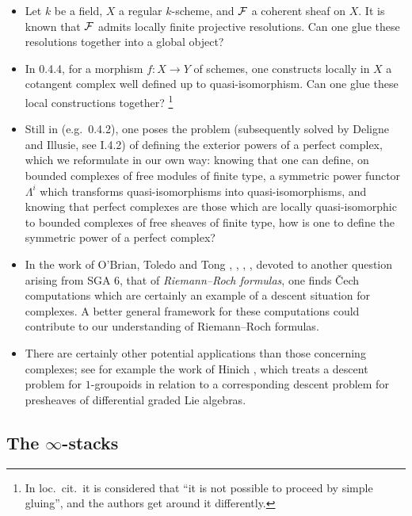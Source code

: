 \begin{itemize}
\item
Let $k$ be a field, $X$ a regular $k$-scheme, and ${\cal F}$ a coherent sheaf on
$X$. It is known that ${\cal F}$ admits locally finite projective resolutions.
Can one glue these resolutions together into a global object?
\item
In \cite{SGA6} 0.4.4, for a morphism $f:X \rightarrow Y$ of schemes, one
constructs locally in $X$ a cotangent complex well defined up to
quasi-isomorphism. Can one glue these local constructions together?
\footnote{In loc.\ cit.\ it is considered that ``it is not possible to
proceed by simple gluing'', and the authors get around it differently.}

\item
Still in \cite{SGA6} (e.g.\ 0.4.2), one poses the problem (subsequently
solved by Deligne and Illusie, see \cite{Illusie} I.4.2) of defining the
exterior powers of a perfect complex, which we reformulate in our own way:
knowing that one can define, on bounded complexes of free modules of finite
type, a symmetric power functor $\Lambda^i$ which transforms
quasi-isomorphisms into quasi-isomorphisms, and knowing that perfect
complexes are those which are locally quasi-isomorphic to bounded complexes
of free sheaves of finite type, how is one to define the symmetric power of a
perfect complex?

\item
In the work of O'Brian, Toledo and Tong \cite{ObrianToledoTong1},
\cite{ObrianToledoTong2}, \cite{Toledo1}, \cite{Toledo2}, \cite{Toledo3}
devoted to another question arising from SGA 6, that of \emph{Riemann--Roch
formulas}, one finds \v{C}ech computations which are certainly an example of
a descent situation for complexes. A better general framework for these
computations could contribute to our understanding of Riemann--Roch formulas.

\item
There are certainly other potential applications than those concerning
complexes; see for example the work of Hinich \cite{Hinich1}, which treats a
descent problem for $1$-groupoids in relation to a corresponding descent
problem for presheaves of differential graded Lie algebras.
\end{itemize}

\subsection*{The \texorpdfstring{$\infty$}{infinity}-stacks}

